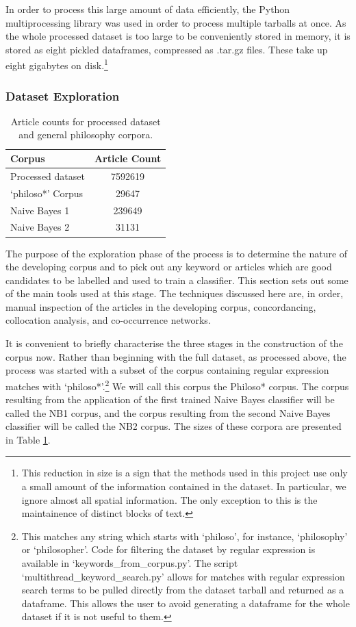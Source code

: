 \documentclass{article}
\begin{document}
In order to process this large amount of data efficiently, the Python multiprocessing library was used in order to process multiple tarballs at once. As the whole processed dataset is too large to be conveniently stored in memory, it is stored as eight pickled dataframes, compressed as .tar.gz files. These take up eight gigabytes on disk.\footnote{This reduction in size is a sign that the methods used in this project use only a small amount of the information contained in the dataset. In particular, we ignore almost all spatial information. The only exception to this is the maintainence of distinct blocks of text.}

\subsubsection{Dataset Exploration}\label{s:explore}

\begin{table}[]
        \centering
        \begin{tabular}{l|c}
             Corpus &  Article Count \\
             \hline
          Processed dataset & 7592619 \\
          `philoso*' Corpus &	29647 \\
          Naive Bayes 1 &	239649 \\
          Naive Bayes 2 & 31131
        \end{tabular}
        \caption{Article counts for processed dataset and general philosophy corpora.}
        \label{t:corpus-sizes}
\end{table}

The purpose of the exploration phase of the process is to determine the nature of the developing corpus and to pick out any keyword or articles which are good candidates to be labelled and used to train a classifier. This section sets out some of the main tools used at this stage. The techniques discussed here are, in order, manual inspection of the articles in the developing corpus, concordancing, collocation analysis, and co-occurrence networks.

It is convenient to briefly characterise the three stages in the construction of the corpus now. Rather than beginning with the full dataset, as processed above, the process was started with a subset of the corpus containing regular expression matches with `philoso*'.\footnote{This matches any string which starts with `philoso', for instance, `philosophy' or `philosopher'. Code for filtering the dataset by regular expression is available in `keywords\_\-from\_\-corpus.py'. The script `multithread\_\-keyword\_\-search.py' allows for matches with regular expression search terms to be pulled directly from the dataset tarball and returned as a dataframe. This allows the user to avoid generating a dataframe for the whole dataset if it is not useful to them.} We will call this corpus the Philoso* corpus. The corpus resulting from the application of the first trained Naive Bayes classifier will be called the NB1 corpus, and the corpus resulting from the second Naive Bayes classifier will be called the NB2 corpus. The sizes of these corpora are presented in Table \ref{t:corpus-sizes}.
\end{document}
